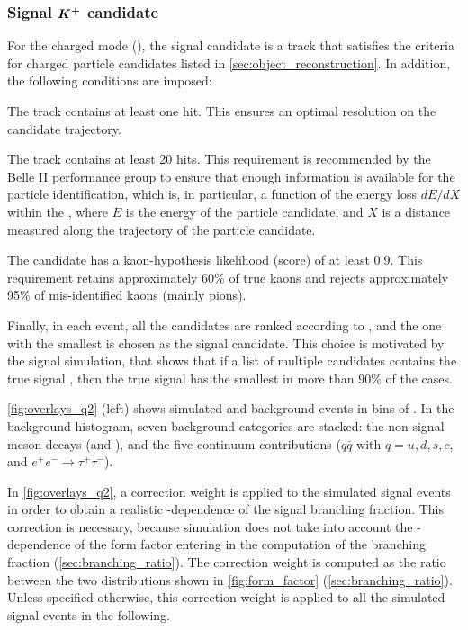 \subsubsection*{Signal $\boldsymbol{K^+}$ candidate}
For the charged mode (\BKpnn), the signal \Kp candidate is a track that satisfies the criteria for charged particle candidates listed in \cref{sec:object_reconstruction}.
In addition, the following conditions are imposed:
\bi
\item The track contains at least one \PXD hit. This ensures an optimal resolution on the candidate trajectory.
\item The track contains at least 20 \CDC hits.
This requirement is recommended by the Belle II performance group to ensure that enough information is available for the particle identification, which is, in particular, a function of the energy loss $dE/dX$ within the \CDC, where $E$ is the energy of the particle candidate, and $X$ is a distance measured along the trajectory of the particle candidate.
\item The candidate has a kaon-hypothesis likelihood (\PID score) of at least 0.9.
This requirement retains approximately 60\% of true kaons and rejects approximately 95\% of mis-identified kaons (mainly pions).
\item Finally, in each event, all the candidates are ranked according to \qrec, and the one with the smallest \qrec is chosen as the signal candidate.
This choice is motivated by the signal simulation, that shows that if a list of multiple candidates contains the true signal \Kp, then the true signal \Kp has the smallest \qrec in more than $90\%$ of the cases. %
\ei

\cref{fig:overlays_q2} (left) shows simulated \BKpnn and background events in bins of \qrec.
In the background histogram, seven background categories are stacked: the non-signal \B meson decays (\epem\to\BpBm and \epem\to\BzBzb), and the five continuum contributions (\epem\to $q\bar{q}$ with $q=u,d,s,c$, and $e^+e^- \to \tau^{+} \tau^{-}$).

In \cref{fig:overlays_q2}, a correction weight is applied to the simulated signal events in order to obtain a realistic \qq-dependence of the signal branching fraction.
This correction is necessary, because simulation does not take into account the \qq-dependence of the form factor entering in the computation of the \BKnn branching fraction (\cref{sec:branching_ratio}).
The correction weight is computed as the ratio between the two distributions shown in \cref{fig:form_factor} (\cref{sec:branching_ratio}).
Unless specified otherwise, this correction weight is applied to all the simulated signal events in the following.

